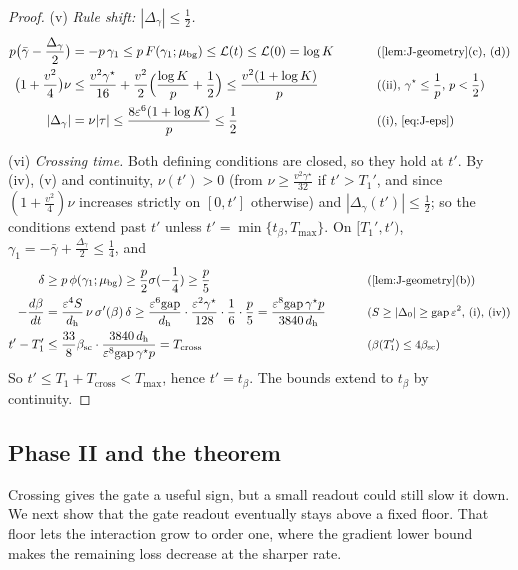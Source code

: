 \begin{proof}
\noindent(v) \emph{Rule shift: $|\Delta_\gamma|\le\frac{1}{2}$.}
\begin{alignat*}{2}
 p\bigl(\bar\gamma-\tfrac{\Delta_\gamma}{2}\bigr)&=-p\,\gamma_1\le p\,F(\gamma_1;\cbg)\le\mathcal L(t)\le\mathcal L(0)=\log K &\qquad& \why{\cref{lem:J-geometry}(c), (d)}\\
 \bigl(1+\tfrac{v^2}{4}\bigr)\nu&\le\frac{v^2\gamma^\star}{16}+\frac{v^2}{2}\Bigl(\frac{\log K}{p}+\frac{1}{2}\Bigr)\le\frac{v^2(1+\log K)}{p} && \why{(ii), $\gamma^\star\le\tfrac{1}{p}$, $p<\tfrac{1}{2}$}\\
 |\Delta_\gamma|&=\nu|\tau|\le\frac{8\initscale^6(1+\log K)}{p}\le\frac{1}{2} && \why{(i), \cref{eq:J-eps}}
\end{alignat*}

\noindent(vi) \emph{Crossing time.} Both defining conditions are closed, so they hold at $t'$. By (iv), (v) and continuity, $\nu(t')>0$ (from
$\nu\ge\frac{v^2\gamma^\star}{32}$ if $t'>T_1'$, and since $(1+\frac{v^2}{4})\nu$ increases strictly on $[0,t']$ otherwise) and $|\Delta_\gamma(t')|\le\frac{1}{2}$; so the
conditions extend past $t'$ unless $t'=\min\{t_\beta,T_{\max}\}$. On $[T_1',t')$, $\gamma_1=-\bar\gamma+\frac{\Delta_\gamma}{2}\le\frac{1}{4}$, and
\begin{alignat*}{2}
 \delta&\ge p\,\phi(\gamma_1;\cbg)\ge\tfrac{p}{2}\sigma(-\tfrac{1}{4})\ge\tfrac{p}{5} &\qquad& \why{\cref{lem:J-geometry}(b)}\\
 -\ddt{\beta}&=\frac{\initscale^4S}{d_{\mathrm h}}\,\nu\,\sigma'(\beta)\,\delta\ge\frac{\initscale^6\mathrm{gap}}{d_{\mathrm h}}\cdot\frac{\initscale^2\gamma^\star}{128}\cdot\frac{1}{6}\cdot\frac{p}{5}
 =\frac{\initscale^8\mathrm{gap}\,\gamma^\star p}{3840\,d_{\mathrm h}} && \why{$S\ge|\Delta_0|\ge\mathrm{gap}\,\initscale^2$, (i), (iv)}\\
 t'-T_1'&\le\frac{33}{8}\beta_{\mathrm{sc}}\cdot\frac{3840\,d_{\mathrm h}}{\initscale^8\mathrm{gap}\,\gamma^\star p}=T_{\mathrm{cross}} && \why{$\beta(T_1')\le4\beta_{\mathrm{sc}}$}
\end{alignat*}
So $t'\le T_1+T_{\mathrm{cross}}<T_{\max}$, hence $t'=t_\beta$. The bounds extend to $t_\beta$ by continuity.
\end{proof}

\subsection{Phase II and the theorem}

Crossing gives the gate a useful sign, but a small readout could still slow it down. We next show that the gate readout eventually
stays above a fixed floor. That floor lets the interaction grow to order one, where the gradient lower bound makes the remaining
loss decrease at the sharper rate.

